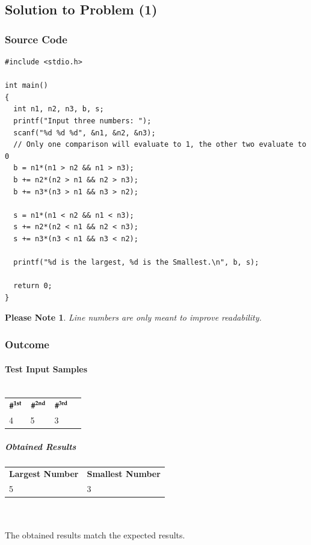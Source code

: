 \documentclass[a4paper,11pt]{article}
\theoremstyle{mytheor}
\theoremstyle{mytheor}
\newtheorem{nb}{Please Note}
\begin{document}
\subsection{Solution to Problem (1)}
\subsubsection{Source Code}
\begin{lstlisting}[escapechar=\^,label={list:first},title=Program's \texttt{\color{inlinecode}{main.c}} File -- console input/output-oriented application to solve the problem]
#include <stdio.h>

int main()
{
  int n1, n2, n3, b, s;
  printf("Input three numbers: ");
  scanf("%d %d %d", &n1, &n2, &n3);
  // Only one comparison will evaluate to 1, the other two evaluate to 0
  b = n1*(n1 > n2 && n1 > n3);
  b += n2*(n2 > n1 && n2 > n3);
  b += n3*(n3 > n1 && n3 > n2);

  s = n1*(n1 < n2 && n1 < n3);
  s += n2*(n2 < n1 && n2 < n3);
  s += n3*(n3 < n1 && n3 < n2);

  printf("%d is the largest, %d is the Smallest.\n", b, s);
  
  return 0;
}
\end{lstlisting}
\begin{nb}
    \small Line numbers are only meant to improve readability.
\end{nb}
\subsubsection{Outcome}
\paragraph{Test Input Samples\\\\}

\begin{tabular}{ l l l l }
$\textbf{\#}^{\textbf{\text{1st}}}$ & $\textbf{\#}^{\textbf{\text{2nd}}}$ & $\textbf{\#}^{\textbf{\text{3rd}}}$\\
4 & 5 & 3\\
\end{tabular}
\subparagraph{Obtained Results}
\begin{tabular}{ l l }
\textbf{Largest Number} & \textbf{Smallest Number} \\
5 & 3 \\
\end{tabular}
\\\\The obtained results match the expected results.
\end{document}
